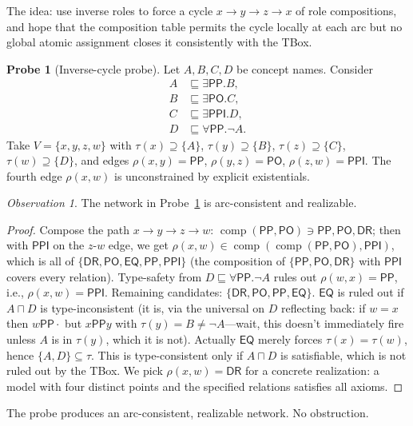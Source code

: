 \documentclass[11pt]{article}
\theoremstyle{definition}
\newtheorem{probe}[theorem]{Probe}
\theoremstyle{remark}
\newtheorem{observation}[theorem]{Observation}
\newcommand{\DR}{\mathsf{DR}}
\newcommand{\PO}{\mathsf{PO}}
\newcommand{\PP}{\mathsf{PP}}
\newcommand{\PPI}{\mathsf{PPI}}
\newcommand{\EQ}{\mathsf{EQ}}
\newcommand{\RCCall}{\{\DR,\PO,\EQ,\PP,\PPI\}}
\newcommand{\comp}{\operatorname{comp}}
\begin{document}
The idea: use inverse roles to force a cycle
$x \to y \to z \to x$ of role compositions, and hope that the
composition table permits the cycle locally at each arc but no
global atomic assignment closes it consistently with the TBox.

\begin{probe}[Inverse-cycle probe]
\label{probe:ic}
Let $A, B, C, D$ be concept names.  Consider
\begin{align*}
  A &\sqsubseteq \exists \PP. B, \\
  B &\sqsubseteq \exists \PO. C, \\
  C &\sqsubseteq \exists \PPI. D, \\
  D &\sqsubseteq \forall \PP. \neg A.
\end{align*}
Take $V = \{x, y, z, w\}$ with
$\tau(x) \supseteq \{A\}$, $\tau(y) \supseteq \{B\}$,
$\tau(z) \supseteq \{C\}$, $\tau(w) \supseteq \{D\}$, and edges
$\rho(x,y) = \PP$, $\rho(y,z) = \PO$, $\rho(z,w) = \PPI$.
The fourth edge $\rho(x, w)$ is unconstrained by explicit
existentials.
\end{probe}

\begin{observation}
\label{obs:ic-ok}
The network in Probe~\ref{probe:ic} is arc-consistent and
realizable.
\end{observation}

\begin{proof}
Compose the path $x \to y \to z \to w$:
$\comp(\PP, \PO) \ni \PP, \PO, \DR$; then with $\PPI$ on the
$z$-$w$ edge, we get $\rho(x, w) \in \comp(\comp(\PP, \PO), \PPI)$,
which is all of $\RCCall$ (the composition of
$\{\PP, \PO, \DR\}$ with $\PPI$ covers every relation).
Type-safety from $D \sqsubseteq \forall \PP. \neg A$ rules out
$\rho(w, x) = \PP$, i.e., $\rho(x, w) = \PPI$.  Remaining
candidates: $\{\DR, \PO, \PP, \EQ\}$.  $\EQ$ is ruled out if
$A \sqcap D$ is type-inconsistent (it is, via the universal on $D$
reflecting back: if $w = x$ then $w \PP \cdot$ but $x \PP y$ with
$\tau(y) = B \neq \neg A$---wait, this doesn't immediately fire
unless $A$ is in $\tau(y)$, which it is not).  Actually $\EQ$
merely forces $\tau(x) = \tau(w)$, hence $\{A, D\} \subseteq
\tau$.  This is type-consistent only if $A \sqcap D$ is
satisfiable, which is not ruled out by the TBox.  We pick
$\rho(x, w) = \DR$ for a concrete realization: a model with four
distinct points and the specified relations satisfies all axioms.
\end{proof}

The probe produces an arc-consistent, realizable network.  No
obstruction.
\end{document}

